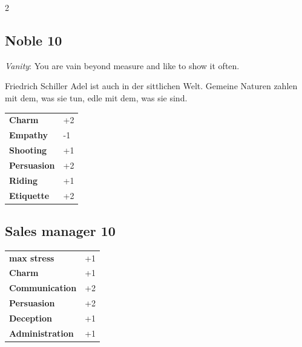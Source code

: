 \begin{multicols}{2}
\begin{tcolorbox}

\end{tcolorbox}

\begin{tcolorbox}
    \subsection*{Noble \hfill \small{10 }}
    \tcblower
\textit{Vanity}: You are vain beyond measure and like to show it often.

\begin{pquote}{Friedrich Schiller}
Adel ist auch in der sittlichen Welt. Gemeine Naturen zahlen mit dem, was sie tun, edle mit dem, was sie sind.
\end{pquote}

\vspace{3mm}

\begin{tabular}{@{}ll@{}}
    \textbf{Charm} & +2\\
    \textbf{Empathy} & -1\\
    \textbf{Shooting} & +1\\
    \textbf{Persuasion} & +2\\
    \textbf{Riding} & +1\\
    \textbf{Etiquette} & +2\\
\end{tabular}


\end{tcolorbox}

\begin{tcolorbox}
    \subsection*{Sales manager \hfill \small{10 }}
    \tcblower




\begin{tabular}{@{}ll@{}}
    \textbf{max stress} & +1\\
    \textbf{Charm} & +1\\
    \textbf{Communication} & +2\\
    \textbf{Persuasion} & +2\\
    \textbf{Deception} & +1\\
    \textbf{Administration} & +1\\
\end{tabular}


\end{tcolorbox}
\end{multicols}
